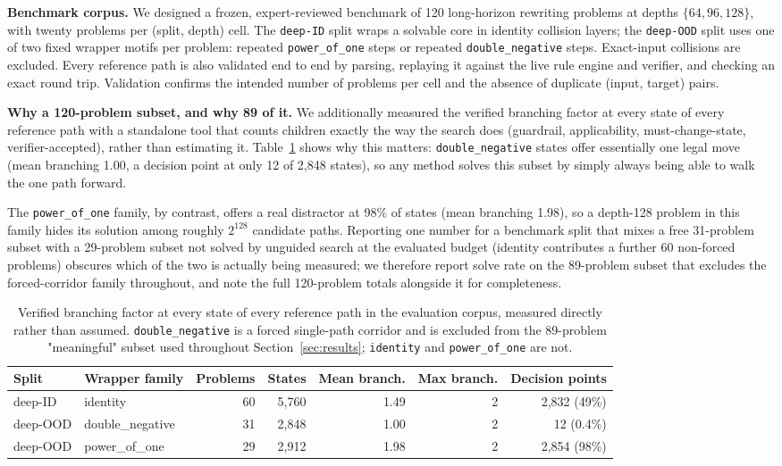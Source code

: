 \documentclass[11pt]{article}
\numberwithin{equation}{section}
\newcommand{\good}{89}
\begin{document}
\textbf{Benchmark corpus.} We designed a frozen, expert-reviewed benchmark of 120 long-horizon rewriting problems at depths $\{64,96,128\}$, with twenty problems per (split, depth) cell. The \texttt{deep-ID} split wraps a solvable core in identity collision layers; the \texttt{deep-OOD} split uses one of two fixed wrapper motifs per problem: repeated \texttt{power\_of\_one} steps or repeated \texttt{double\_negative} steps. Exact-input collisions are excluded. Every reference path is also validated end to end by parsing, replaying it against the live rule engine and verifier, and checking an exact round trip. Validation confirms the intended number of problems per cell and the absence of duplicate (input, target) pairs.

\textbf{Why a 120-problem subset, and why 89 of it.} We additionally measured the verified branching factor at every state of every reference path with a standalone tool that counts children exactly the way the search does (guardrail, applicability, must-change-state, verifier-accepted), rather than estimating it. Table~\ref{tab:branching} shows why this matters: \texttt{double\_negative} states offer essentially one legal move (mean branching 1.00, a decision point at only 12 of 2{,}848 states), so any method solves this subset by simply always being able to walk the one path forward.

The \texttt{power\_of\_one} family, by contrast, offers a real distractor at 98\% of states (mean branching 1.98), so a depth-128 problem in this family hides its solution among roughly $2^{128}$ candidate paths. Reporting one number for a benchmark split that mixes a free 31-problem subset with a 29-problem subset not solved by unguided search at the evaluated budget (identity contributes a further 60 non-forced problems) obscures which of the two is actually being measured; we therefore report solve rate on the \good{}-problem subset that excludes the forced-corridor family throughout, and note the full 120-problem totals alongside it for completeness.

\begin{table}[t]
\centering
\small
\begin{tabular}{@{}llrrrrr@{}}
\toprule
Split & Wrapper family & Problems & States & Mean branch. & Max branch. & Decision points \\
\midrule
deep-ID  & identity          & 60 & 5{,}760 & 1.49 & 2 & 2{,}832 (49\%) \\
deep-OOD & double\_negative  & 31 & 2{,}848 & 1.00 & 2 & 12 (0.4\%) \\
deep-OOD & power\_of\_one    & 29 & 2{,}912 & 1.98 & 2 & 2{,}854 (98\%) \\
\bottomrule
\end{tabular}
\caption{Verified branching factor at every state of every reference path in the evaluation corpus, measured directly rather than assumed. \texttt{double\_negative} is a forced single-path corridor and is excluded from the \good{}-problem "meaningful" subset used throughout Section~\ref{sec:results}; \texttt{identity} and \texttt{power\_of\_one} are not.}
\label{tab:branching}
\end{table}
\end{document}
